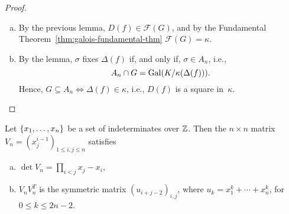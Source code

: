 \begin{proof}${}$
    \begin{enumerate}[a), font=\upshape]
        \item By the previous lemma, $D(f)\in\mathcal F(G)$, and by the Fundamental Theorem~\ref{thm:galois-fundamental-thm} $\mathcal F(G)=\kappa$.

        \item By the lemma, $\sigma$ fixes $\Delta(f)$ if, and only if, $\sigma\in A_n$, i.e.,
        $$
            A_n\cap G=\operatorname{Gal}(K/\kappa(\Delta(f))).
        $$
        Hence, $G\subseteq A_n\iff\Delta(f)\in\kappa$, i.e., $D(f)$ is a square in~$\kappa$.
    \end{enumerate}
    
\end{proof}

\begin{thm}
    Let $\{x_1,\dots,x_n\}$ be a set of indeterminates over $\mathbb{Z}$. Then the $n\times n$ matrix $V_n=(x_j^{i-1})_{1\le i,j\le n}$ satisfies
    \begin{enumerate}[a), font=\upshape]
        \item $\det V_n=\prod_{i<j}x_j-x_i$,
        \item $V_nV_n^T$ is the symmetric matrix $(u_{i+j-2})_{i,j}$, where $u_k=x_1^k+\cdots+x_n^k$, for $0\le k\le 2n-2$.
    \end{enumerate}
\end{thm}

